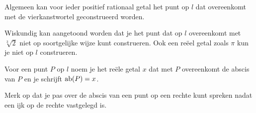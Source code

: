 
Algemeen kan voor ieder positief rationaal getal het punt op $l$ dat overeenkomt met de vierkanstwortel geconstrueerd worden.

Wiskundig kan aangetoond worden dat je het punt dat op $l$ overeenkomt met $\sqrt[3]{2}$ niet op soortgelijke wijze kunt construeren.
Ook een re\"eel getal zoals $\pi$ kun je niet op $l$ construeren.\vspace{2mm}

\begin{definitie}
	Voor een punt $P$ op $l$ noem je het re\"ele getal $x$ dat met $P$ overeenkomt de abscis van $P$ en je schrijft $\operatorname{ab} (P)=x$.
\end{definitie}



Merk op dat je pas over de abscis van een punt op een rechte kunt spreken nadat een ijk op de rechte vastgelegd is.\vspace{2mm}

